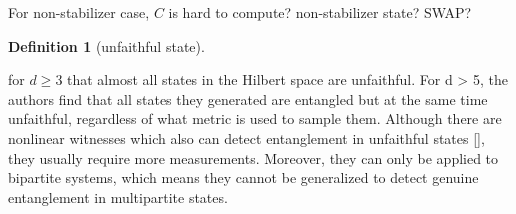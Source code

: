\documentclass[
10pt,
aps,
pra,
linenumbers,
floatfix,
]{revtex4-2}
\theoremstyle{plain}
\newtheorem{question}{Question}
\theoremstyle{definition}
\newtheorem{definition}{Definition}
\begin{document}
For non-stabilizer case, \cite{zhangEfficientEntanglementGeneration2021} \cite{zhuMachineLearningDerivedEntanglement2021}
$C$ is hard to compute? non-stabilizer state? SWAP?

\cite{weilenmannEntanglementDetectionMeasuring2020}
\begin{definition}[unfaithful state]\label{def:unfaithful_state}
\end{definition}
\cite{zhanDetectingEntanglementUnfaithful2021}
for $d \ge 3$ that almost all states in the Hilbert space are unfaithful. For d > 5, the authors find that all states they generated are entangled but at the same time unfaithful, regardless of what metric is used to sample them.
Although there are nonlinear witnesses which also can detect entanglement in unfaithful states [], they usually require more measurements.
Moreover, they can only be applied to bipartite systems, which means they cannot be generalized to detect genuine entanglement in multipartite states.
\end{document}
